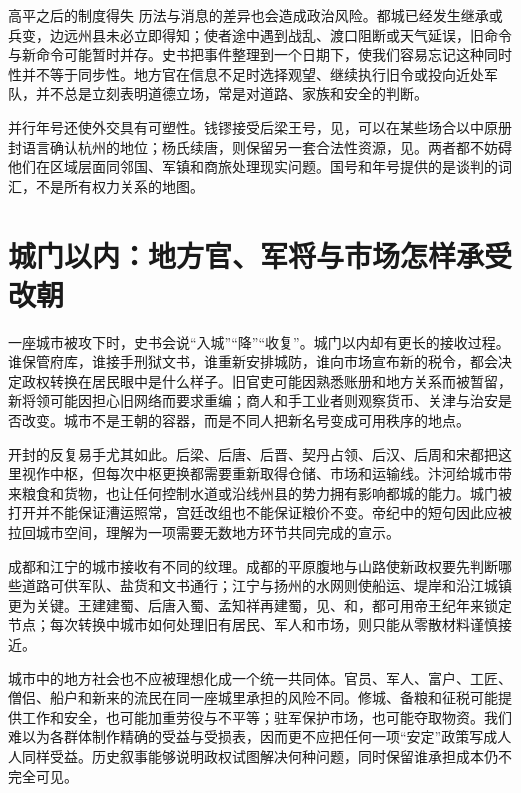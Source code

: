 \begin{causalchain}{高平之后的制度得失}
历法与消息的差异也会造成政治风险。都城已经发生继承或兵变，边远州县未必立即得知；使者途中遇到战乱、渡口阻断或天气延误，旧命令与新命令可能暂时并存。史书把事件整理到一个日期下，使我们容易忘记这种同时性并不等于同步性。地方官在信息不足时选择观望、继续执行旧令或投向近处军队，并不总是立刻表明道德立场，常是对道路、家族和安全的判断。

并行年号还使外交具有可塑性。钱镠接受后梁王号，见，可以在某些场合以中原册封语言确认杭州的地位；杨氏续唐，则保留另一套合法性资源，见。两者都不妨碍他们在区域层面同邻国、军镇和商旅处理现实问题。国号和年号提供的是谈判的词汇，不是所有权力关系的地图。

\section{城门以内：地方官、军将与市场怎样承受改朝}

一座城市被攻下时，史书会说“入城”“降”“收复”。城门以内却有更长的接收过程。谁保管府库，谁接手刑狱文书，谁重新安排城防，谁向市场宣布新的税令，都会决定政权转换在居民眼中是什么样子。旧官吏可能因熟悉账册和地方关系而被暂留，新将领可能因担心旧网络而要求重编；商人和手工业者则观察货币、关津与治安是否改变。城市不是王朝的容器，而是不同人把新名号变成可用秩序的地点。

开封的反复易手尤其如此。后梁、后唐、后晋、契丹占领、后汉、后周和宋都把这里视作中枢，但每次中枢更换都需要重新取得仓储、市场和运输线。汴河给城市带来粮食和货物，也让任何控制水道或沿线州县的势力拥有影响都城的能力。城门被打开并不能保证漕运照常，宫廷改组也不能保证粮价不变。帝纪中的短句因此应被拉回城市空间，理解为一项需要无数地方环节共同完成的宣示。

成都和江宁的城市接收有不同的纹理。成都的平原腹地与山路使新政权要先判断哪些道路可供军队、盐货和文书通行；江宁与扬州的水网则使船运、堤岸和沿江城镇更为关键。王建建蜀、后唐入蜀、孟知祥再建蜀，见、和，都可用帝王纪年来锁定节点；每次转换中城市如何处理旧有居民、军人和市场，则只能从零散材料谨慎接近。

城市中的地方社会也不应被理想化成一个统一共同体。官员、军人、富户、工匠、僧侣、船户和新来的流民在同一座城里承担的风险不同。修城、备粮和征税可能提供工作和安全，也可能加重劳役与不平等；驻军保护市场，也可能夺取物资。我们难以为各群体制作精确的受益与受损表，因而更不应把任何一项“安定”政策写成人人同样受益。历史叙事能够说明政权试图解决何种问题，同时保留谁承担成本仍不完全可见。


\end{causalchain}

